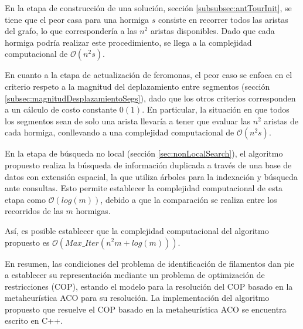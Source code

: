 En la etapa de construcci\'on de una soluci\'on, secci\'on \ref{subsubsec:antTourInit},  se tiene que el peor casa para una hormiga $s$ consiste en recorrer todos las aristas del grafo, lo que correspondería a las $n^2$ aristas disponibles. Dado que cada hormiga podr\'ia realizar este procedimiento, se llega a la complejidad computacional de $\mathcal{O}{(n^{2}s)}$.

En cuanto a la etapa de actualizaci\'on de feromonas, el peor caso se enfoca en el criterio respeto a la magnitud del deplazamiento entre segmentos (secci\'on \ref{subsec:magnitudDesplazamientoSegs}), dado que los otros criterios corresponden a un c\'alculo de costo constante $\mathcal{0}{(1)}$. En particular, la situaci\'on en que todos los segmentos sean de solo una arista llevar\'ia a tener que evaluar las $n^2$ aristas de cada hormiga, conllevando a una complejidad computacional de $\mathcal{O}{(n^{2}s)}$.

En la etapa de b\'usqueda no local (secci\'on \ref{sec:nonLocalSearch}), el algoritmo propuesto realiza la b\'usqueda de informaci\'on duplicada a trav\'es de una base de datos con extensi\'on espacial, la que utiliza \'arboles para la indexaci\'on y b\'usqueda ante consultas. Esto permite establecer la complejidad computacional de esta etapa como $\mathcal{O}{(log(m))}$, debido a que la comparaci\'on se realiza entre los recorridos de las $m$ hormigas.

As\'i, es posible establecer que la complejidad computacional del algoritmo propuesto es $\mathcal{O}{(Max\_Iter (n^{2}m + log(m)))}$.

\vspace{1.5cm}
En resumen, las condiciones del problema de identificaci\'on de filamentos dan pie a establecer su representaci\'on mediante un problema de optimizaci\'on de restricciones (COP), estando el modelo para la resoluci\'on del COP basado en la metaheur\'istica ACO para su resoluci\'on. La implementaci\'on del algoritmo propuesto que resuelve el COP basado en la metaheur\'istica ACO se encuentra escrito en C++.